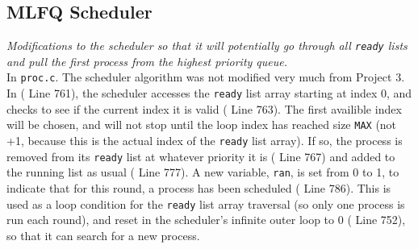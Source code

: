 \documentclass[11pt,letterpaper]{report}
\begin{document}
	
	\subsection{MLFQ Scheduler}
	\emph{Modifications to the scheduler so that it will potentially go through all {\tt ready} lists and pull the first process from the highest priority queue.}\\
	In {\tt proc.c}. The scheduler algorithm was not modified very much from Project 3. In ({\color{red} Line 761}), the scheduler accesses the {\tt ready} list array starting at index 0, and checks to see if the current index it is valid ({\color{red} Line 763}). The first availible index will be chosen, and will not stop until the loop index has reached size {\tt MAX} (not +1, because this is the actual index of the {\tt ready} list array). If so, the process is removed from its {\tt ready} list at whatever priority it is ({\color{red} Line 767}) and added to the running list as usual ({\color{red} Line 777}). A new variable, {\tt ran}, is set from 0 to 1, to indicate that for this round, a process has been scheduled ({\color{red} Line 786}). This is used as a loop condition for the {\tt ready} list array traversal (so only one process is run each round), and reset in the scheduler's infinite outer loop to 0 ({\color{red} Line 752}), so that it can search for a new process.
	
	
\end{document}
